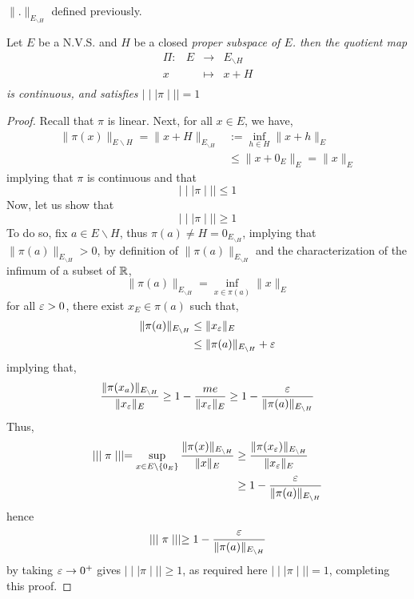 $\| . \| _{E _{ \backslash H}} $  defined previously.
\divider
\begin{theorem}[]
Let $E $ be a N.V.S. and $H $ be a closed \it proper \normalfont subspace of 
$E$.  then the quotient map 
\[
\begin{array}{cccc}
      \Pi  : &  E  & \longrightarrow & E_{ \backslash H} \\

             x&    & \longmapsto     &  x + H\\ 
\end{array}
\]
is continuous, and satisfies $ \mid \mid \mid  \pi  \mid \mid \mid = 1 $ 
\end{theorem}
\begin{proof}
Recall that $\pi  $ is linear. Next, for all $x \in  E $, we have, 
\begin{align*}
\| \pi  (x)  \|  _{E \backslash H}
= 
\| x + H \| _{E _{ \backslash H}}  
&:= 
\inf_{h \in H}  \| x + h \| _{E} 
\\
& \leq 
\| x + 0_{E} \| _{E} = \| x \| _{E}
\end{align*}
implying that $\pi$ is continuous and that 
\[
\mid \mid \mid  \pi  \mid \mid \mid  \leq 1
\]
Now, let us show that  
\[
\mid \mid \mid  \pi  \mid \mid \mid  \geq 1
\]
To do so, fix $a \in E \backslash H $, thus
$\pi (a)  \neq  H = 0_{E _{ \backslash H}}$,
implying that $\| \pi (a)  \| _{E _{ \backslash H}} > 0$, 
by definition of $\| \pi (a)  \| _{E _{ \backslash H}} $ 
and the characterization of the infimum of a 
subset of $\mathbb{R}  $, 
\[
	\| \pi (a)  \|  _{E _{ \backslash H}} 
	= \inf_{x \in  \pi (a) }  
	\| x \| _{E} 
\]
for all $ \varepsilon > 0 $, there exist 
$x_{E} \in \pi (a) $ such that, 
\begin{align*}
\| \pi (a)  \|  _{E _{ \backslash H}}   
&\leq 
\| x_{ \varepsilon } \|  _{E} 
 \\
& \leq 
\| \pi (a)  \|  _{E _{ \backslash H}} + 
\varepsilon 
\end{align*}
implying that, 
\[
\frac{\| \pi (x_{a})  \|_{E_{ \backslash H} }}{ \| x_{ \varepsilon } \|_{E} } 
\geq 1 - \frac{me}{\| x_{ \varepsilon } \| _{E}} 
\geq 
1 - \frac{\varepsilon }{\| \pi (a)  \| _{E_{ \backslash H} }}
\]
Thus, 
\begin{align*}
\mid \mid \mid  \pi  \mid \mid \mid  = 
\sup_{x \in  E \backslash \left\{ 0_{E} \right\}}  
\frac{\| \pi (x)   \|_{ E_{ \backslash H} } }{ \| x \|_{E} } 
& \geq 
\frac{\| \pi (x_{ \varepsilon })  \| _{E_{ \backslash H} }}{\| x_{\varepsilon } \| _{E}} 
\\
& \geq 1 - \frac{ \varepsilon }{\| \pi (a)  \| _{E_{ \backslash H} }}
\end{align*}
hence 
\[
\mid \mid \mid  \pi  \mid \mid \mid  \geq 1 - 
\frac{\varepsilon }{\| \pi (a)  \| _{E_{ \backslash H} }}
\]
by taking $ \varepsilon  \rightarrow  0^{+} $  
gives $\mid \mid \mid  \pi  \mid \mid \mid  \geq 1$, as required 
here $\mid \mid \mid  \pi  \mid \mid \mid =1 $, completing this proof.
\end{proof}
